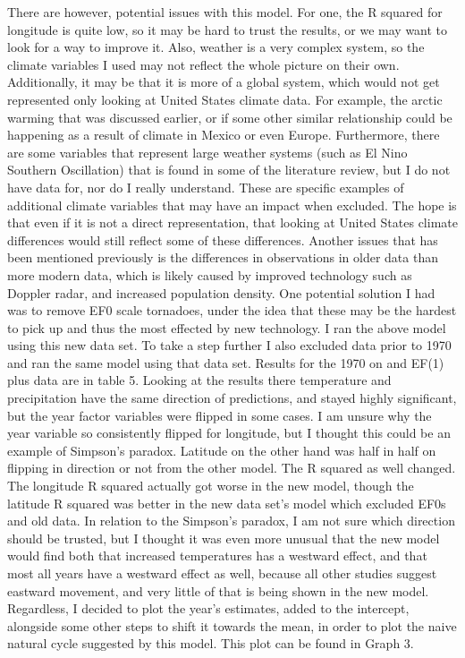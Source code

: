 \documentclass[12pt,english]{article}
\begin{document}
There are however, potential issues with this model. For one, the R squared for longitude is quite low, so it may be hard to trust the results, or we may want to look for a way to improve it. Also, weather is a very complex system, so the climate variables I used may not reflect the whole picture on their own. Additionally, it may be that it is more of a global system, which would not get represented only looking at United States climate data. For example, the arctic warming that was discussed earlier, or if some other similar relationship could be happening as a result of climate in Mexico or even Europe. Furthermore, there are some variables that represent large weather systems (such as El Nino Southern Oscillation) that is found in some of the literature review, but I do not have data for, nor do I really understand. These are specific examples of additional climate variables that may have an impact when excluded. The hope is that even if it is not a direct representation, that looking at United States climate differences would still reflect some of these differences. Another issues that has been mentioned previously is the differences in observations in older data than more modern data, which is likely caused by improved technology such as Doppler radar, and increased population density. One potential solution I had was to remove EF0 scale tornadoes, under the idea that these may be the hardest to pick up and thus the most effected by new technology. I ran the above model using this new data set. To take a step further I also excluded data prior to 1970 and ran the same model using that data set. Results for the 1970 on and EF(1) plus data are in table 5. Looking at the results there temperature and precipitation have the same direction of predictions, and stayed highly significant, but the year factor variables were flipped in some cases. I am unsure why the year variable so consistently flipped for longitude, but I thought this could be an example of Simpson's paradox. Latitude on the other hand was half in half on flipping in direction or not from the other model. The R squared as well changed. The longitude R squared actually got worse in the new model, though the latitude R squared was better in the new data set's model which excluded EF0s and old data. In relation to the Simpson's paradox, I am not sure which direction should be trusted, but I thought it was even more unusual that the new model would find both that increased temperatures has a westward effect, and that most all years have a westward effect as well, because all other studies suggest eastward movement, and very little of that is being shown in the new model. Regardless, I decided to plot the year's estimates, added to the intercept, alongside some other steps to shift it towards the mean, in order to plot the naive natural cycle suggested by this model. This plot can be found in Graph 3.
\end{document}
